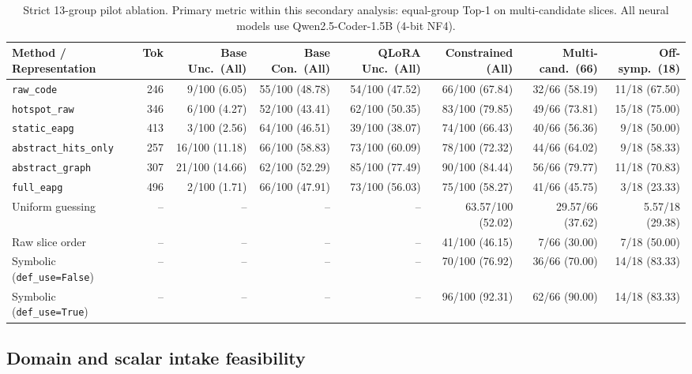 \begin{table}[t]
\centering\footnotesize
\setlength{\tabcolsep}{3.5pt}
\caption{Strict 13-group pilot ablation. Primary metric within this secondary analysis: equal-group Top-1 on multi-candidate slices. All neural models use Qwen2.5-Coder-1.5B (4-bit NF4).}
\label{tab:eapg-resplit-ablation}
\begin{tabular}{@{}lrrrrrrr@{}}
\toprule
Method / Representation & Tok & Base Unc.\ (All) & Base Con.\ (All) & QLoRA Unc.\ (All) & Constrained (All) & Multi-cand.\ (66) & Off-symp.\ (18) \\
\midrule
\texttt{raw\_code} & 246 & 9/100 (6.05) & 55/100 (48.78) & 54/100 (47.52) & 66/100 (67.84) & 32/66 (58.19) & 11/18 (67.50) \\
\texttt{hotspot\_raw} & 346 & 6/100 (4.27) & 52/100 (43.41) & 62/100 (50.35) & 83/100 (79.85) & 49/66 (73.81) & 15/18 (75.00) \\
\texttt{static\_eapg} & 413 & 3/100 (2.56) & 64/100 (46.51) & 39/100 (38.07) & 74/100 (66.43) & 40/66 (56.36) & 9/18 (50.00) \\
\texttt{abstract\_hits\_only} & 257 & 16/100 (11.18) & 66/100 (58.83) & 73/100 (60.09) & 78/100 (72.32) & 44/66 (64.02) & 9/18 (58.33) \\
\texttt{abstract\_graph} & 307 & 21/100 (14.66) & 62/100 (52.29) & 85/100 (77.49) & 90/100 (84.44) & 56/66 (79.77) & 11/18 (70.83) \\
\texttt{full\_eapg} & 496 & 2/100 (1.71) & 66/100 (47.91) & 73/100 (56.03) & 75/100 (58.27) & 41/66 (45.75) & 3/18 (23.33) \\
\midrule
Uniform guessing & -- & -- & -- & -- & 63.57/100 (52.02) & 29.57/66 (37.62) & 5.57/18 (29.38) \\
Raw slice order & -- & -- & -- & -- & 41/100 (46.15) & 7/66 (30.00) & 7/18 (50.00) \\
Symbolic (\texttt{def\_use=False}) & -- & -- & -- & -- & 70/100 (76.92) & 36/66 (70.00) & 14/18 (83.33) \\
Symbolic (\texttt{def\_use=True}) & -- & -- & -- & -- & 96/100 (92.31) & 62/66 (90.00) & 14/18 (83.33) \\
\bottomrule
\end{tabular}
\end{table}

\subsection{Domain and scalar intake feasibility}

